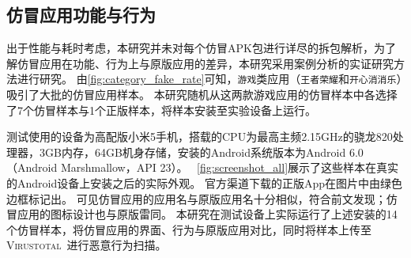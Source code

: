 \subsection{仿冒应用功能与行为}
\label{sec:func_and_behavior}



出于性能与耗时考虑，本研究并未对每个仿冒APK包进行详尽的拆包解析，为了解仿冒应用在功能、行为上与原版应用的差异，本研究采用案例分析的实证研究方法进行研究。
由\autoref{fig:category_fake_rate}可知，\texttt{游戏}类应用（\texttt{王者荣耀}和\texttt{开心消消乐}）吸引了大批的仿冒应用样本。
本研究随机从这两款游戏应用的仿冒样本中各选择了7个仿冒样本与1个正版样本，将样本安装至实验设备上运行。

测试使用的设备为高配版小米5手机，搭载的CPU为最高主频2.15GHz的骁龙820处理器，3GB内存，64GB机身存储，安装的Android系统版本为Android 6.0（Android Marshmallow，API 23）。
~\autoref{fig:screenshot_all}展示了这些样本在真实的Android设备上安装之后的实际外观。
官方渠道下载的正版App在图片中由绿色边框标记出。
可见仿冒应用的应用名与原版应用名十分相似，符合前文发现；仿冒应用的图标设计也与原版雷同。
本研究在测试设备上实际运行了上述安装的14个仿冒样本，将仿冒应用的界面、行为与原版应用对比，同时将样本上传至\textsc{Virustotal}~\cite{virustotal}进行恶意行为扫描。

